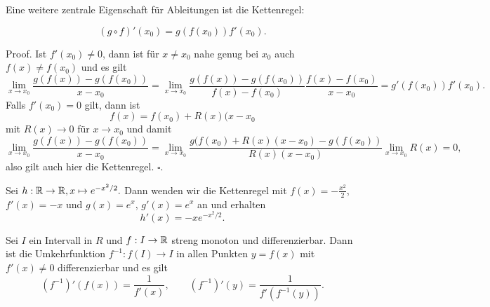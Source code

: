 Eine weitere zentrale Eigenschaft für Ableitungen ist die Kettenregel:
\label{differential/kombfkt:theorem-3}
\begin{theorem}{}{}


\begin{equation*}
 (g\circ f)'(x_0) = g(f(x_0)) f'(x_0).
\end{equation*}\end{theorem}

\begin{emphBox}{}{}
Proof. Ist \(f'(x_0) \neq 0\), dann ist für \(x\neq x_0\) nahe genug bei \(x_0\) auch \(f(x) \neq f(x_0)\) und es gilt
\begin{equation*}
\lim_{x \rightarrow x_0} \frac{g(f(x))-g(f(x_0))}{x-x_0} = \lim_{x \rightarrow x_0} \frac{g(f(x))-g(f(x_0))}{f(x)-f(x_0)}
 \frac{f(x)-f(x_0)}{x-x_0} = g'(f(x_0)) f'(x_0).
\end{equation*}
Falls \(f'(x_0)=0\) gilt, dann ist
\begin{equation*}
f(x) = f(x_0) +  R(x)(x-x_0
\end{equation*}
mit \(R(x) \rightarrow  0\) für \(x \rightarrow x_0\) und damit
\begin{equation*}
\lim_{x \rightarrow x_0} \frac{g(f(x))-g(f(x_0))}{x-x_0} =  
\lim_{x \rightarrow x_0} \frac{g(f(x_0)+R(x)(x-x_0)-g(f(x_0))}{R(x)(x-x_0)}  \lim_{x \rightarrow x_0} R(x) = 0,
\end{equation*}
also gilt auch hier die Kettenregel. \(\square\).
\end{emphBox}
\label{differential/kombfkt:example-4}
\begin{example}{}{}



Sei \(h: \mathbb{R} \rightarrow \mathbb{R}, x\mapsto e^{-x^2/2}.\) Dann wenden wir die Kettenregel mit \(f(x) = -\frac{x^2}2\), \(f'(x) = -x\) und
\(g(x) = e^x\), \(g'(x)=e^x\) an und erhalten
\begin{equation*}
h'(x) = - x e^{-x^2/2}.
\end{equation*}\end{example}
\label{differential/kombfkt:theorem-5}
\begin{theorem}{}{}



Sei \(I\) ein Intervall in \(R\) und \(f: I \rightarrow \mathbb{R}\) streng monoton und differenzierbar. Dann ist die Umkehrfunktion \(f^{-1}: f(I) \rightarrow I\) in allen Punkten \(y=f(x)\) mit \(f'(x) \neq 0\) differenzierbar und es gilt
\begin{equation*}
 (f^{-1})'(f(x)) = \frac{1}{f'(x)}, \qquad (f^{-1})'(y) = \frac{1}{f'(f^{-1}(y))}.
\end{equation*}\end{theorem}

